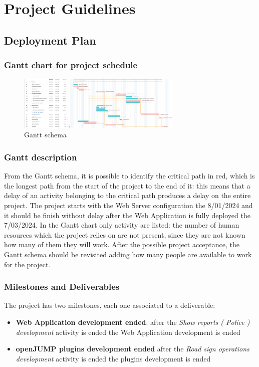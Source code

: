 \section{Project Guidelines}
\subsection{Deployment Plan}

\subsubsection{Gantt chart for project schedule}

    \begin{figure}[h]
        \centering
        \includegraphics[width=0.7\textwidth]{images/GANTT.png}
        \caption{Gantt schema}
       \end{figure}

\subsubsection{Gantt description}
From the Gantt schema, it is possible to identify the critical path in red, which is the longest path from the start of the project to the end of it: this means that a delay of an activity belonging to the critical path produces a delay on the entire project.
The project starts with the Web Server configuration the 8/01/2024 and it should be finish without delay after the Web Application is fully deployed the 7/03/2024.
In the Gantt chart only activity are listed: the number of human resources which the project relies on are not present, since they are not known how many of them they will work.
After the possible project acceptance, the Gantt schema should be revisited adding how many people are available to work for the project.

\subsubsection{Milestones and Deliverables}
The project has two milestones, each one associated to a deliverable:
\begin{itemize}
    \item \textbf{Web Application development ended}: after the \textit{Show reports ( Police ) development} activity is ended the Web Application development is ended
    \item \textbf{openJUMP plugins development ended} after the \textit{Road sign operations development} activity is ended the plugins development is ended
\end{itemize}


